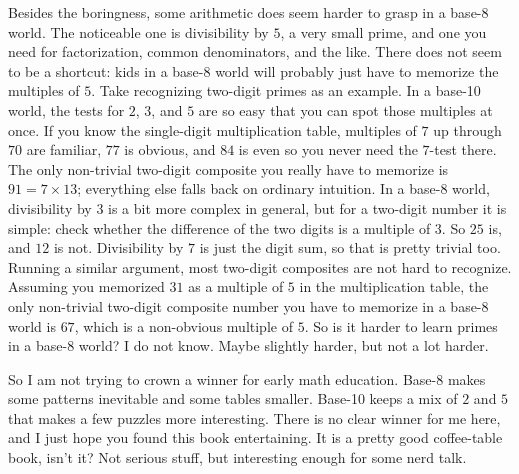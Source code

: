 Besides the boringness, some arithmetic does seem harder to grasp in a base-8 world. The noticeable one is divisibility by $5$, a very small prime, and one you need for factorization, common denominators, and the like. There does not seem to be a shortcut: kids in a base-8 world will probably just have to memorize the multiples of $5$. Take recognizing two-digit primes as an example. In a base-10 world, the tests for $2$, $3$, and $5$ are so easy that you can spot those multiples at once. If you know the single-digit multiplication table, multiples of $7$ up through $70$ are familiar, $77$ is obvious, and $84$ is even so you never need the $7$-test there. The only non-trivial two-digit composite you really have to memorize is $91 = 7 \times 13$; everything else falls back on ordinary intuition. In a base-8 world, divisibility by $3$ is a bit more complex in general, but for a two-digit number it is simple: check whether the difference of the two digits is a multiple of $3$. So $25$ is, and $12$ is not. Divisibility by $7$ is just the digit sum, so that is pretty trivial too. Running a similar argument, most two-digit composites are not hard to recognize. Assuming you memorized $31$ as a multiple of $5$ in the multiplication table, the only non-trivial two-digit composite number you have to memorize in a base-8 world is $67$, which is a non-obvious multiple of $5$. So is it harder to learn primes in a base-8 world? I do not know. Maybe slightly harder, but not a lot harder.

So I am not trying to crown a winner for early math education. Base-8 makes some patterns inevitable and some tables smaller. Base-10 keeps a mix of $2$ and $5$ that makes a few puzzles more interesting. There is no clear winner for me here, and I just hope you found this book entertaining. It is a pretty good coffee-table book, isn't it? Not serious stuff, but interesting enough for some nerd talk.
